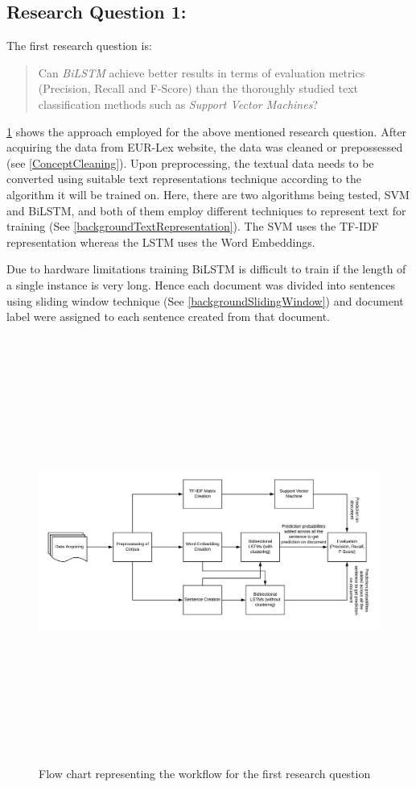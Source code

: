 \subsection{Research Question 1:} \label{question1}
The first research question is:
\begin{quote}
    Can \textit{\gls{BiLSTM}} achieve better results in terms of evaluation metrics (Precision, Recall and F-Score) than the thoroughly studied text classification methods such as \textit{Support Vector Machines}?
\end{quote}

\ref{fig:FlowResearchQuestion1} shows the approach employed for the above mentioned research question. After acquiring the data from EUR-Lex website, the data was cleaned or prepossessed (see \ref{ConceptCleaning}). Upon preprocessing, the textual data needs to be converted using suitable text representations technique according to the algorithm it will be trained on. Here, there are two algorithms being tested, \gls{SVM} and \gls{BiLSTM}, and both of them employ different techniques to represent text for training (See \ref{backgroundTextRepresentation}). The \gls{SVM} uses the \gls{TF-IDF} representation whereas the LSTM uses the Word Embeddings. 
 
Due to hardware limitations training \gls{BiLSTM} is difficult to train if the length of a single instance is very long. Hence each document was divided into sentences using sliding window technique (See \ref{backgroundSlidingWindow}) and document label were assigned to each sentence created from that document. 

\begin{figure}[!ht]
    \centering
    \includegraphics[width=15cm, height=14cm,keepaspectratio]{pics/flowforQuestion1.jpeg}
    \caption{Flow chart representing the workflow for the first research question }
    \label{fig:FlowResearchQuestion1}
\end{figure}

